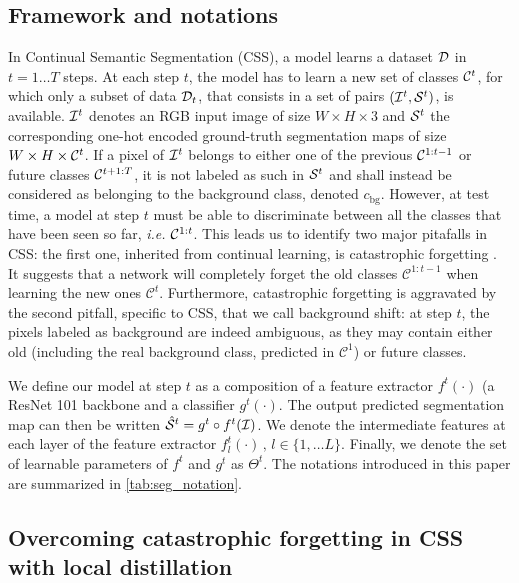 \subsection{Framework and notations}\label{sec:seg_overview}



In Continual Semantic Segmentation (\ac{CSS}), a model learns a dataset  $\mathcal{D}$ in $t=1 \dots T$ steps.
At each step $t$, the model has to learn a new set of classes $\mathcal{C}^t$, for which only a subset of
data $\mathcal{D}_t$, that consists in a set of pairs $(\mathcal{I}^t, \mathcal{S}^t)$, is available. $\mathcal{I}^t$ denotes an
RGB input image of size $W \times H \times 3$ and $\mathcal{S}^t$ the corresponding one-hot encoded
ground-truth segmentation maps of size $W \times H \times \mathcal{C}^t$. If a pixel of $\mathcal{I}^t$ belongs to
either one of the previous $\mathcal{C}^{1:t-1}$ or future classes $\mathcal{C}^{t+1:T}$, it is not labeled as
such in $\mathcal{S}^t$ and shall instead be considered as belonging to the background class, denoted
$c_\text{bg}$. However, at test time, a model at step $t$ must be able to discriminate between all
the classes that have been seen so far, \textit{i.e.} $\mathcal{C}^{1:t}$. This leads us to identify two
major pitafalls in \ac{CSS}: the first one, inherited from continual learning, is catastrophic forgetting
\cite{robins1995catastrophicforgetting,french1999catastrophicforgetting}. It suggests that a network
will completely forget the old classes $\mathcal{C}^{1:t-1}$ when learning the new ones
$\mathcal{C}^t$. Furthermore, catastrophic forgetting is aggravated by the second pitfall, specific
to \ac{CSS}, that we call background shift: at step $t$, the pixels labeled as background are indeed
ambiguous, as they may contain either old (including the real background class, predicted in
$\mathcal{C}^{1}$) or future classes.

We define our model at step $t$ as a composition of a feature extractor $f^t(\cdot)$ (a ResNet 101
\cite{he2016resnet} backbone and a classifier $g^t(\cdot)$. The output predicted segmentation map
can then be written $\hat{\mathcal{S}}^t = g^t \circ f^t(\mathcal{I})$. We denote the intermediate features at
each layer of the feature extractor $f_l^t(\cdot)\,,\, l \in \{1, \dots L\}$. Finally, we denote the
set of learnable parameters of $f^t$ and $g^t$ as $\Theta^t$. The notations introduced in this paper
are summarized in \autoref{tab:seg_notation}.


\subsection{Overcoming catastrophic forgetting in \ac{CSS} with local
    distillation}\label{sec:seg_distillation}


